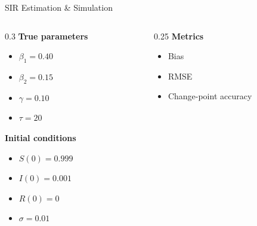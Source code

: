 \documentclass[
  ignorenonframetext,
  aspectratio=169,
]{beamer}
\providecommand{\tightlist}{%
  \setlength{\itemsep}{0pt}\setlength{\parskip}{0pt}}\usepackage{longtable,booktabs,array}
\begin{document}
\begin{frame}[fragile]{SIR Estimation \& Simulation}
\begin{columns}[T]
\begin{column}{0.3\textwidth}
\textbf{True parameters}

\begin{itemize}
\tightlist
\item
  \(\beta_1 = 0.40\)\\
\item
  \(\beta_2 = 0.15\)\\
\item
  \(\gamma = 0.10\)\\
\item
  \(\tau = 20\)
\end{itemize}

\textbf{Initial conditions}

\begin{itemize}
\item
  \(S(0) = 0.999\)\\
\item
  \(I(0) = 0.001\)\\
\item
  \(R(0) = 0\)
\item
  \(\sigma = 0.01\)
\end{itemize}
\end{column}

\begin{column}{0.25\textwidth}
\textbf{Metrics}

\begin{itemize}
\tightlist
\item
  Bias\\
\item
  RMSE\\
\item
  Change-point accuracy
\end{itemize}
\end{column}
\end{columns}
\end{frame}
\end{document}
